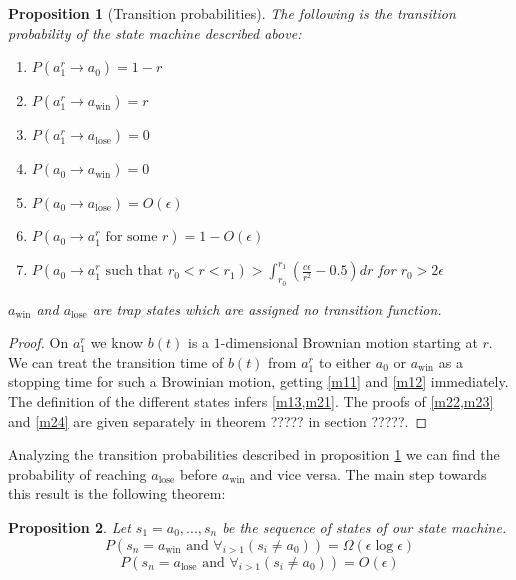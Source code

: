 \documentclass[11pt]{article}
\def \ds{\displaystyle}
\newtheorem{propos}{Proposition}
\begin{document}
{\begin{propos}[Transition probabilities]\label{prop:trans}
The following is the transition probability of the state machine described above:
\begin{enumerate}
\item\label{m11} $P(a^r_1\rightarrow a_0)=1-r$
\item\label{m12} $P(a^r_1\rightarrow a_\text{win})=r$
\item\label{m13} $P(a^r_1\rightarrow a_\text{lose})=0$
\item\label{m21} $P(a_0\rightarrow a_\text{win})=0$
\item\label{m22} $P(a_0\rightarrow a_\text{lose})=O(\epsilon)$
\item\label{m23} $P(a_0\rightarrow a^r_1 \text{ for some }r)=1-O(\epsilon)$
\item\label{m24} $P(a_0\rightarrow a^r_1 \text{ such that } r_0<r<r_1)>\ds\int_{r_0}^{r_1}(\frac{c\epsilon}{r^2}-0.5)dr$ for $r_0>2\epsilon$ 
\end{enumerate}
$a_\text{win}$ and $a_\text{lose}$ are trap states which are assigned no transition function.
\end{propos}

\begin{proof}
 On $a^r_1$ we know $b(t)$ is a $1$-dimensional Brownian motion starting at $r$. We can treat the transition time of $b(t)$ from $a^r_1$ to either $a_0$ or $a_\text{win}$ as a stopping time for such a Browinian motion, getting \ref{m11} and \ref{m12} immediately. The definition of the different states infers \ref{m13,m21}. The proofs of \ref{m22,m23} and \ref{m24} are given separately in theorem ????? in section ?????. 
\end{proof}  

Analyzing the transition probabilities described in proposition \ref{prop:trans} we can find the probability of reaching $a_\text{lose}$ before $a_\text{win}$ and vice versa. The main step towards this result is the following theorem:

\begin{propos}\label{prop:winlose1}
Let $s_1=a_0,...,s_n$ be the sequence of states of our state machine. 
$$P(s_n=a_\text{win} \text{ and } \ds\forall_{i>1}(s_i\neq a_0))=\Omega(\epsilon\log\epsilon)$$
$$P(s_n=a_\text{lose} \text{ and } \ds\forall_{i>1}(s_i\neq a_0))=O(\epsilon)$$
\end{propos}


}
\end{document}
